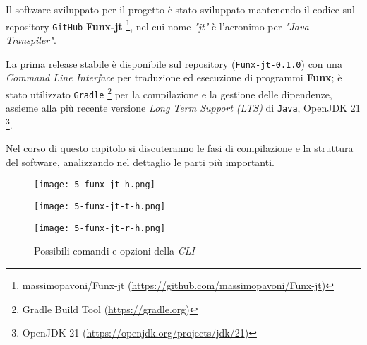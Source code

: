 \chapter{}
\label{chap:5-compiler}

Il software sviluppato per il progetto è stato sviluppato mantenendo il codice sul repository \texttt{GitHub} \textbf{Funx-jt}%
\footnote{massimopavoni/Funx-jt (\url{https://github.com/massimopavoni/Funx-jt})},
nel cui nome \textit{"jt"} è l'acronimo per \textit{"Java Transpiler"}.

\noindent La prima release stabile è disponibile sul repository (\texttt{Funx-jt-0.1.0})
con una \textit{Command Line Interface} per traduzione ed esecuzione di programmi \textbf{Funx};
è stato utilizzato \texttt{Gradle}%
\footnote{Gradle Build Tool (\url{https://gradle.org})}
per la compilazione e la gestione delle dipendenze,
assieme alla più recente versione \textit{Long Term Support (LTS)} di \texttt{Java}, OpenJDK 21%
\footnote{OpenJDK 21 (\url{https://openjdk.org/projects/jdk/21})}.

Nel corso di questo capitolo si discuteranno le fasi di compilazione e la struttura del software,
analizzando nel dettaglio le parti più importanti.

\begin{figure}
    \vspace{4mm}
    \begin{minipage}{0.85\textwidth}
        \texttt{[image: 5-funx-jt-h.png]}
        \vspace{2mm}
    \end{minipage}
    \begin{minipage}{0.85\textwidth}
        \texttt{[image: 5-funx-jt-t-h.png]}
        \vspace{2mm}
    \end{minipage}
    \begin{minipage}{0.85\textwidth}
        \texttt{[image: 5-funx-jt-r-h.png]}
    \end{minipage}
    \caption{Possibili comandi e opzioni della \textit{CLI}}
    \label{fig:5-compiler-cli}
\end{figure}

\newpage



\newpage



\newpage



\newpage

